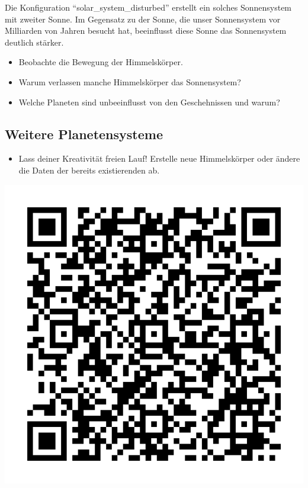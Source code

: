 \documentclass{scrartcl}
\begin{document}
        Die Konfiguration "`solar\_system\_disturbed"' erstellt ein solches Sonnensystem mit zweiter Sonne.
        Im Gegensatz zu der Sonne, die unser Sonnensystem vor Milliarden von Jahren besucht hat, beeinflusst diese Sonne das Sonnensystem deutlich stärker.
        \begin{itemize}
            \item Beobachte die Bewegung der Himmelskörper.
            \item Warum verlassen manche Himmelskörper das Sonnensystem?
            \item Welche Planeten sind unbeeinflusst von den Geschehnissen und warum?
        \end{itemize}

        \subsection*{Weitere Planetensysteme}
        \begin{itemize}
        \item Lass deiner Kreativität freien Lauf! Erstelle neue Himmelskörper oder ändere die Daten der bereits existierenden ab.
        \end{itemize}
        \vfill\hfill
        \includegraphics[width=.2\textwidth]{qr.png}
\end{document}

